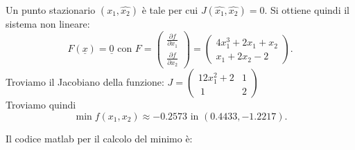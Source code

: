 Un punto stazionario $(\hat{x_1}, \hat{x_2})$ è tale per cui $J(\hat{x_1},\hat{x_2})=0$. Si ottiene quindi il sistema non lineare:
$$F(\underline{x})=\underline{0}\mbox{ con }F=\begin{pmatrix}\frac{\partial f}{\partial x_1}\\\frac{\partial f}{\partial x_2}\end{pmatrix}=\begin{pmatrix}4x_1^3+2x_1+x_2\\x_1+2x_2-2\end{pmatrix}.$$
Troviamo il Jacobiano della funzione: \( J=\begin{pmatrix} 12x_1^2+2 & 1  \\\ 1 & 2 \end{pmatrix} \)\\

Troviamo quindi $$\min{f(x_1,x_2)}\approx -0.2573\mbox{ in }(0.4433, -1.2217).$$

Il codice matlab per il calcolo del minimo è:

